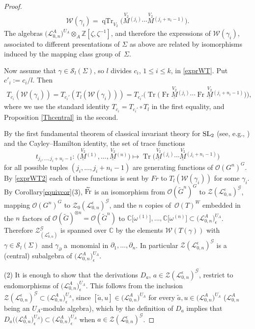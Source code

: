 \documentclass[pdftex]{sigma}%
\numberwithin{equation}{section}
\numberwithin{figure}{section}
\newcommand{\e}{\epsilon}
\newcommand{\mc}{\mathbb{C}}
\newcommand{\mz}{\mathbb{Z}}
\newcommand{\Gg}{{\mathcal G}}
\newcommand{\Ll}{{\mathcal L}}
\begin{document}
\begin{proof}
\begin{gather*}%
\mathcal{W}(\gamma_i) = \operatorname{qTr}_{V_2} \big(\! \stackrel{V_2}{M}{}^{\!\! (j_i)}\cdots \stackrel{V_2}{M}{}^{\!\! (j_i + n_i-1)}\big).
\end{gather*}
The algebras $\big(\Ll_{0,n}^A\big)^{U_A}\otimes_A \mz[\zeta,\zeta^{-1}]$, and therefore the expressions of $\mathcal{W}(\gamma_i)$, associated to different presentations of $\Sigma$ as above are related by isomorphisms induced by the mapping class group of~$\Sigma$.

Now assume that $\gamma\in\mathcal{S}_l(\Sigma)$, so $l$ divides $c_i$, $1\leq i\leq k$, in \eqref{exprWT}. Put $c'_i:=c_i/l$. Then
\begin{gather}
T_{c_i}(\mathcal{W}(\gamma_i)) = T_{c_i'}(T_l(\mathcal{W}(\gamma_i)))
 = T_{c_i'}\big(\!\operatorname{Tr}\big(\!\operatorname{Fr}\underline{\stackrel{V_2}{M}}{}^{(j_i)}\cdots \operatorname{Fr}\underline{\stackrel{V_2}{M}}{}^{(j_i+n_i-1)}\big)\big), \label{exprWT2}
 \end{gather}
where we use the standard identity $T_{c_i} = T_{c_i'}\circ T_l$ in the first equality, and Proposition \ref{Thcentral} in the second.

By the first fundamental theorem of classical invariant theory for ${\rm SL}_2$ (see, e.g., \cite{KP}) and the Cayley--Hamilton identity, the set of trace functions
\[
t_{j_i,\dots,j_i+n_i-1}\colon\ \big(\underline{\stackrel{V_2}{M}}{}^{(1)},\dots,\underline{\stackrel{V_2}{M}}{}^{(n)}\big)\mapsto \operatorname{Tr}\big(\underline{\stackrel{V_2}{M}}{}^{(j_i)}\cdots \underline{\stackrel{V_2}{M}}{}^{(j_i+n_i-1)}\big)
\]
for all possible tuples $(j_i,\dots,j_i+n_i-1)$ are generating functions of $\mathcal{O}(G^n)^G$. By \eqref{exprWT2} each of these functions is sent by $Fr$ to $T_l\left(\mathcal{W}(\gamma_i)\right)$ for some $\gamma_i$. By Corollary\ref{equivcor}(3), $\widetilde{\rm Fr}$ is an isomorphism from $\mathcal{O}(\tilde G^n)^G$ to $\mathcal{Z}(\Ll_{0,n}^\e)^\Gg$, mapping $\mathcal{O}(G^n)^G$ to $\mathcal{Z}_0(\Ll_{0,n}^\e)^\Gg$, and the $n$ copies of~$\mathcal{O}(T)^W$ embedded in the $n$ factors of $\mathcal{O}(\tilde G)^{\otimes n} = \mathcal{O}(\tilde G^n)$ to $\mc\big[\omega^{(1)}\big],\dots,\mc\big[\omega^{(n)}\big]\subset \big(\Ll_{0,n}^A\big)^{U_A}_\e$. Therefore $\mathcal{Z}_(\Ll_{0,n}^\e)^\Gg$ is spanned over $\mc$ by the elements $\mathcal{W}(T(\gamma))$ with $\gamma\in\mathcal{S}_l(\Sigma)$ and $\gamma_\partial$ a~monomial in $\partial_1,\dots,\partial_n$. In particular $\mathcal{Z}(\Ll_{0,n}^\e)^\Gg$ is a (central) subalgebra of $\big(\Ll_{0,n}^A\big)^{U_A}_\e$.

(2) It is enough to show that the derivations $D_a$, $a\in \mathcal{Z}(\Ll_{0,n}^\e)^\Gg$, restrict to endomorphisms of $\big(\Ll_{0,n}^A\big)^{U_A}_\e$. This follows from the inclusion $\mathcal{Z}(\Ll_{0,n}^\e)^\Gg\subset \big(\Ll_{0,n}^A\big)^{U_A}_\e$, since $[\tilde{a},u] \in \big(\Ll_{0,n}^A\big)^{U_A}$ for every $\tilde{a}, u\in \big(\Ll_{0,n}^A\big)^{U_A}$ ($\Ll_{0,n}^A$ being an $U_A$-module algebra), which by the definition of $D_a$ implies that $D_a\big(\big(\Ll_{0,n}^A\big)^{U_A}_\e\big) \subset \big(\Ll_{0,n}^A\big)^{U_A}_\e$ when $a\in \mathcal{Z}(\Ll_{0,n}^\e)^\Gg$.
\end{proof}
\end{document}
